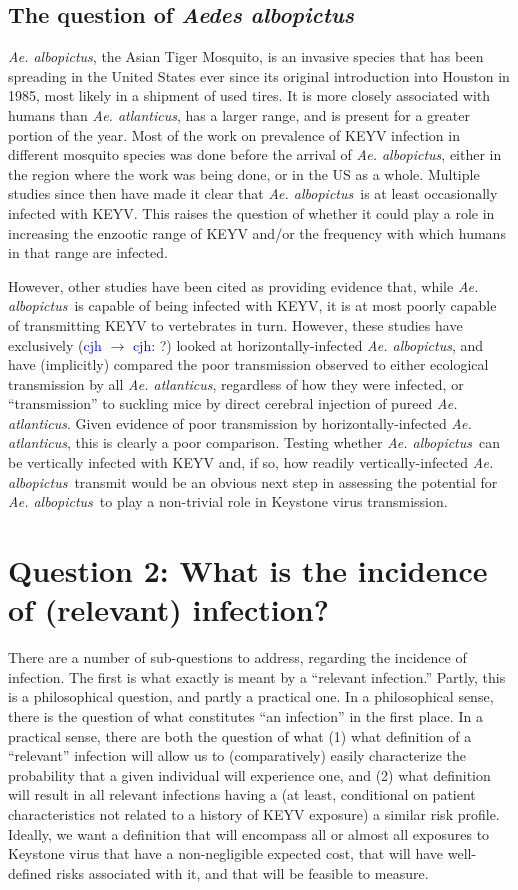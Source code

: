 \documentclass[12pt]{article}
\newcommand{\alb}{\textit{Ae. albopictus}}
\newcommand{\atl}{\textit{Ae. atlanticus}}
\newcommand{\cjh}{\textcolor{blue}{cjh}}
\newcommand{\msg}[3]{(#1 $\rightarrow$ #2: #3)}
\newcommand{\mcc}[1]{\msg\cjh\cjh{#1}}
\begin{document}
        \subsection{The question of \textit{Aedes albopictus}}
            \alb, the Asian Tiger Mosquito, is an invasive species that has been spreading in the United States ever since its original introduction into Houston in 1985, most likely in a shipment of used tires. It is more closely associated with humans than \atl, has a larger range, and is present for a greater portion of the year. Most of the work on prevalence of KEYV infection in different mosquito species was done before the arrival of \alb, either in the region where the work was being done, or in the US as a whole. Multiple studies since then have made it clear that \alb\ is at least occasionally infected with KEYV. This raises the question of whether it could play a role in increasing the enzootic range of KEYV and/or the frequency with which humans in that range are infected.

            However, other studies have been cited as providing evidence that, while \alb\ is capable of being infected with KEYV, it is at most poorly capable of transmitting KEYV to vertebrates in turn. However, these studies have exclusively \mcc{?} looked at horizontally-infected \alb, and have (implicitly) compared the poor transmission observed to either ecological transmission by all \atl, regardless of how they were infected, or ``transmission'' to suckling mice by direct cerebral injection of pureed \atl. Given evidence of poor transmission by horizontally-infected \atl, this is clearly a poor comparison. Testing whether \alb\ can be vertically infected with KEYV and, if so, how readily vertically-infected \alb\ transmit would be an obvious next step in assessing the potential for \alb\ to play a non-trivial role in Keystone virus transmission.


    \section[Incidence of infection]{Question 2: What is the incidence of (relevant) infection?}

        There are a number of sub-questions to address, regarding the incidence of infection. The first is what exactly is meant by a ``relevant infection.'' Partly, this is a philosophical question, and partly a practical one. In a philosophical sense, there is the question of what constitutes ``an infection'' in the first place. In a practical sense, there are both the question of what (1) what definition of a ``relevant'' infection will allow us to (comparatively) easily characterize the probability that a given individual will experience one, and (2) what definition will result in all relevant infections having a (at least, conditional on patient characteristics not related to a history of KEYV exposure) a similar risk profile. Ideally, we want a definition that will encompass all or almost all exposures to Keystone virus that have a non-negligible expected cost, that will have well-defined risks associated with it, and that will be feasible to measure.
\end{document}
